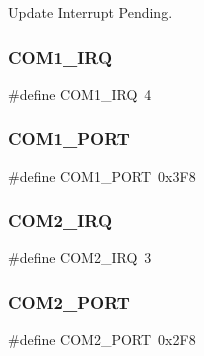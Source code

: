 Update Interrupt Pending. 

\hypertarget{group___serial_ga3685c78b9bd6dd0fa3861807e24a4e1b}{}\label{group___serial_ga3685c78b9bd6dd0fa3861807e24a4e1b} 
\subsubsection{\texorpdfstring{C\+O\+M1\+\_\+\+I\+RQ}{COM1\_IRQ}}
{\footnotesize\ttfamily \#define C\+O\+M1\+\_\+\+I\+RQ~4}

\hypertarget{group___serial_ga8982f081d8608e775b0739cde65373d5}{}\label{group___serial_ga8982f081d8608e775b0739cde65373d5} 
\subsubsection{\texorpdfstring{C\+O\+M1\+\_\+\+P\+O\+RT}{COM1\_PORT}}
{\footnotesize\ttfamily \#define C\+O\+M1\+\_\+\+P\+O\+RT~0x3\+F8}

\hypertarget{group___serial_gab02d84052a299a0c207a8ea4c1a5636d}{}\label{group___serial_gab02d84052a299a0c207a8ea4c1a5636d} 
\subsubsection{\texorpdfstring{C\+O\+M2\+\_\+\+I\+RQ}{COM2\_IRQ}}
{\footnotesize\ttfamily \#define C\+O\+M2\+\_\+\+I\+RQ~3}

\hypertarget{group___serial_ga88373c3e34a242356333ec08389eae54}{}\label{group___serial_ga88373c3e34a242356333ec08389eae54} 
\subsubsection{\texorpdfstring{C\+O\+M2\+\_\+\+P\+O\+RT}{COM2\_PORT}}
{\footnotesize\ttfamily \#define C\+O\+M2\+\_\+\+P\+O\+RT~0x2\+F8}

\hypertarget{group___serial_gad37cf3225412330f91c3fb21b2611109}{}\label{group___serial_gad37cf3225412330f91c3fb21b2611109} 
